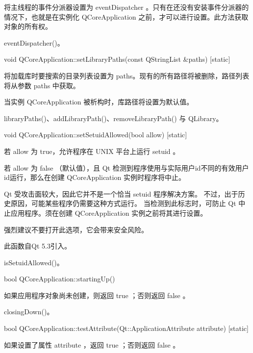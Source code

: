 将主线程的事件分派器设置为 eventDispatcher 。只有在还没有安装事件分派器的情况下，也就是在实例化 QCoreApplication 之前，才可以进行设置。此方法获取对象的所有权。

\begin{seeAlso}
eventDispatcher()。
\end{seeAlso}

void QCoreApplication::setLibraryPaths(const QStringList \&paths) [static]

将加载库时要搜索的目录列表设置为 paths。现有的所有路径将被删除，路径列表将从参数 paths 中获取。

当实例 QCoreApplication 被析构时，库路径将设置为默认值。

\begin{seeAlso}
libraryPaths()、addLibraryPath()、removeLibraryPath() 与 QLibrary。
\end{seeAlso}

void QCoreApplication::setSetuidAllowed(bool allow) [static]

若 allow 为 true，允许程序在 UNIX 平台上运行 setuid 。

若 allow 为 false （默认值），且 Qt 检测到程序使用与实际用户id不同的有效用户id运行，那么在创建 QCoreApplication 实例时程序将中止。

Qt 受攻击面较大，因此它并不是一个恰当 setuid 程序解决方案。 不过，出于历史原因，可能某些程序仍需要这种方式运行。 当检测到此标志时，可防止 Qt 中止应用程序。须在创建 QCoreApplication 实例之前将其进行设置。



\begin{notice}
强烈建议不要打开此选项，它会带来安全风险。
\end{notice}

此函数自Qt 5.3引入。

\begin{seeAlso}
isSetuidAllowed()。
\end{seeAlso}

bool QCoreApplication::startingUp()

如果应用程序对象尚未创建，则返回 true ；否则返回 false 。



\begin{seeAlso}
closingDown()。
\end{seeAlso}

bool QCoreApplication::testAttribute(Qt::ApplicationAttribute attribute) [static]

如果设置了属性 attribute ，返回 true ；否则返回 false 。


